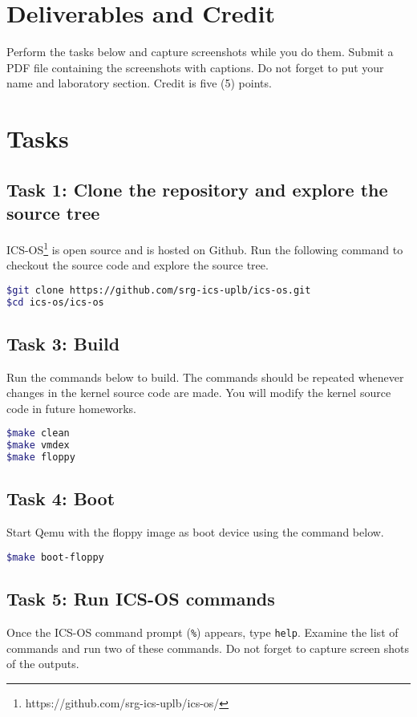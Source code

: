 \documentclass[a4paper, 11pt,oneside]{article}
\begin{document}
\section{Deliverables and Credit}
Perform the tasks below and capture screenshots while you do them. Submit a PDF 
file containing the screenshots with captions. Do not forget to put your name 
and laboratory section. Credit is five (5) points.


\section{Tasks}

\subsection*{Task 1: Clone the repository and explore the source tree}
ICS-OS\footnote{https://github.com/srg-ics-uplb/ics-os/} is open source and is hosted on Github. Run the following command to 
checkout the source code and explore the source tree.
\begin{lstlisting}[language=bash,frame=single] 
$git clone https://github.com/srg-ics-uplb/ics-os.git
$cd ics-os/ics-os
\end{lstlisting}

\subsection*{Task 3: Build}
Run the commands below to build. The commands should be repeated 
whenever changes in the kernel source code are made. You will modify the kernel source 
code in future homeworks. 
\begin{lstlisting}[language=bash,frame=single] 
$make clean
$make vmdex
$make floppy 
\end{lstlisting}

\subsection*{Task 4: Boot}
Start Qemu with the floppy image as boot device using the command below. 
\begin{lstlisting}[language=bash,frame=single] 
$make boot-floppy 
\end{lstlisting}

\subsection*{Task 5: Run ICS-OS commands}
Once the ICS-OS command prompt (\texttt{\%}) appears, type \texttt{help}. 
Examine the list of commands and run two of these commands. Do not forget 
to capture screen shots of the outputs.

\end{document}
